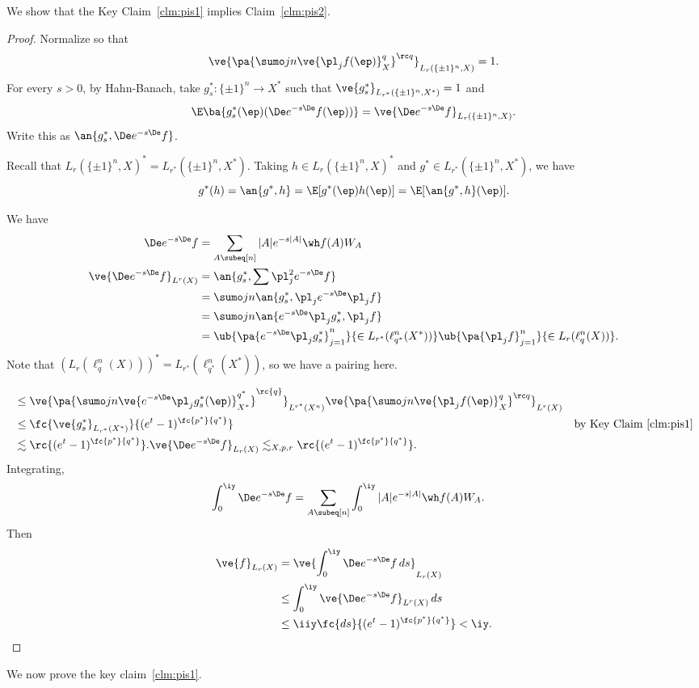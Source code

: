 We show that the Key Claim~\ref{clm:pis1} implies Claim~\ref{clm:pis2}. 
\begin{proof}
Normalize so that
\[
\ve{\pa{\sumo jn \ve{\pl_j f(\ep)}_X^q}^{\rc q}}_{L_r(\{\pm 1\}^n, X)}=1.
\]
For every $s>0$, by Hahn-Banach, take $g_s^*:\{\pm 1\}^n\to X^*$ such that $\ve{g_s^*}_{L_{r^*}(\{\pm 1\}^n,X^*)}=1$ and
\[
\E\ba{g_s^*(\ep) (\De e^{-s\De} f(\ep))} = \ve{\De e^{-s\De} f}_{L_r(\{\pm 1\}^n, X)}.
\]
Write this as $\an{g_s^*, \De e^{-s\De}f}$. 

Recall that $L_r(\{\pm 1\}^n,X)^* = L_{r^*}(\{\pm 1\}^n, X^*)$. Taking $h\in L_r(\{\pm 1\}^n,X)^*$ and $g^*\in  L_{r^*}(\{\pm 1\}^n, X^*)$, we have 
\[
g^*(h)= \an{g^*,h} = \E[g^*(\ep)h(\ep)] = \E[\an{g^*,h}(\ep)].
\]

We have
\begin{align}
\De e^{-s\De} f &=\sum_{A\subeq [n]}|A|e^{-s|A|}\wh f(A)W_A\\
\ve{\De e^{-s\De}f}_{L^r(X)}&=\an{g_s^*, \sum \pl_j^2 e^{-s\De}f}\\
&=\sumo jn \an{g_s^*, \pl_j e^{-s\De}\pl_jf}\\
&=\sumo jn \an{e^{-s\De} \pl_jg_s^*, \pl_jf}\\
&=\ub{\pa{e^{-s\De} \pl_jg_s^*}_{j=1}^n}{\in L_{r^*}(\ell_{q^*}^n(X^*))} \ub{\pa{\pl_j f}_{j=1}^n}{\in L_r(\ell_q^n(X))}.
\end{align}
Note that $(L_r(\ell_q^n(X)))^* = L_{r^*}(\ell_{q^*}^n(X^*))$, so we have a pairing here.

\begin{align}
&\le \ve{ \pa{ \sumo jn \ve{e^{-s\De} \pl_j g_s^*(\ep)}_{X^*}^{q^*}}^{\rc{q}
}}_{L^{r^*}(X^n)}
\ve{\pa{\sumo jn \ve{\pl_j f(\ep)}_X^q}^{\rc q}}_{L^r(X)}\\
&\le \fc{\ve{g_s^*}_{L_{r^*}(X^*)}}{(e^t-1)^{\fc{p^*}{q^*}}}
 &\text{by Key Claim~\ref{clm:pis1}}\\
&\lesssim \rc{(e^t-1)^{\fc{p^*}{q^*}}}.
\ve{\De e^{-s\De} f}_{L_r(X)} \lesssim_{X,p,r} \rc{(e^t-1)^{\fc{p^*}{q^*}}}.
\end{align}
Integrating,
\begin{align}
\int_0^{\iy} \De e^{-s\De} f &=\sum_{A\subeq [n]}\int_0^{\iy}|A|e^{-s|A|}\wh f(A)W_A.
\end{align}
Then
\begin{align}
\ve{f}_{L_r(X)} &= \ve{\int_0^{\iy} \De e^{-s\De} f\,ds}_{L_r(X)}\\
&\le \int_0^{\iy}\ve{\De e^{-s\De} f}_{L^r(X)}\,ds\\
&\le \iiy \fc{ds}{(e^t-1)^{\fc{p^*}{q^*}}}<\iy.
\end{align}
\end{proof}
We now prove the key claim~\ref{clm:pis1}.

